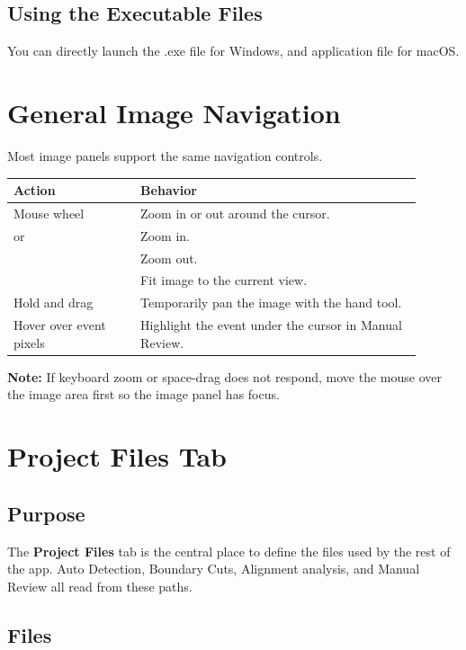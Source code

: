 \documentclass[11pt]{article}
\newcommand{\ui}[1]{\textbf{#1}}
\newcommand{\code}[1]{\texttt{\detokenize{#1}}}
\newcommand{\note}[1]{\vspace{0.3em}\noindent\textcolor{blue!70!black}{\textbf{Note:}} #1\vspace{0.3em}}
\begin{document}
\subsection{Using the Executable Files}
You can directly launch the .exe file for Windows, and application file for macOS. 

\section{General Image Navigation}

Most image panels support the same navigation controls.

\begin{longtable}{p{0.28\linewidth}p{0.62\linewidth}}
\toprule
\textbf{Action} & \textbf{Behavior} \\
\midrule
Mouse wheel & Zoom in or out around the cursor. \\
\code{+} or \code{=} & Zoom in. \\
\code{-} & Zoom out. \\
\code{0} & Fit image to the current view. \\
Hold \code{Space} and drag & Temporarily pan the image with the hand tool. \\
Hover over event pixels & Highlight the event under the cursor in Manual Review. \\
\bottomrule
\end{longtable}

\note{If keyboard zoom or space-drag does not respond, move the mouse over the image area first so the image panel has focus.}

\section{Project Files Tab}

\subsection{Purpose}

The \ui{Project Files} tab is the central place to define the files used by the rest of the app. Auto Detection, Boundary Cuts, Alignment analysis, and Manual Review all read from these paths.

\subsection{Files}
\end{document}
